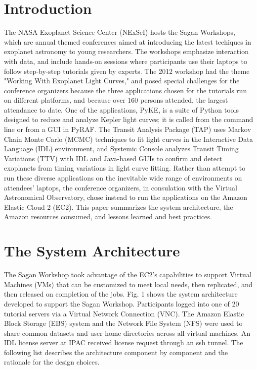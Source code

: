 \documentclass[11pt,twoside]{article}
\begin{document}
\begin{abstract}
We will describe the mechanisms for handling security, failovers, and licensing of commercial software. In particular, IDL licenses were managed through a server at Caltech, connected to the IDL instances running on Amazon EC2 via a Secure Shell (ssh) tunnel. The system operated flawlessly during the workshop.

\end {abstract}

\section{Introduction}
The NASA Exoplanet Science Center (NExScI) hosts the Sagan Workshops, which are annual themed conferences aimed at introducing the latest techiques in exoplanet astronomy to young researchers. The workshops emphasize interaction with data, and include hands-on sessions where participants use their laptops to follow step-by-step tutorials given by experts.  The 2012 workshop had the theme "Working With Exoplanet Light Curves," and posed special challenges for the conference organizers because the  three applications chosen for the tutorials run on different platforms, and because over 160 persons attended,  the largest attendance to date. One of the applications, PyKE, is a suite of Python tools designed to reduce and analyze Kepler light curves; it is called from the command line or from a GUI in PyRAF. The Transit Analysis Package (TAP) uses Markov Chain Monte Carlo (MCMC) techniques to fit light curves in the Interactive Data Language (IDL) environment, and Systemic Console analyzes Transit Timing Variations (TTV) with IDL and Java-based GUIs to confirm and detect exoplanets from timing variations in light curve fitting.  Rather than attempt to run these diverse applications on the inevitable wide range of environments on attendees' laptops, the conference organizers, in consulation with the Virtual Astronomical Observatory, chose instead to run the applications on the Amazon Elastic Cloud 2 (EC2). This paper summarizes the system architecture, the Amazon resources consumed, and lessons learned and best practices.

\section{The System Architecture}

The Sagan Workshop took advantage of the EC2's capabilities to support Virtual Machines (VMs) that can be customized to meet local needs, then replicated, and then released on completion of the jobs. Fig. 1 shows the system architecture developed to support the Sagan Workshop. Participants logged into one of 20 tutorial servers via a Virtual Network Connection (VNC). The Amazon Elastic Block Storage (EBS) system and the Network File System (NFS) were used to share common datasets and user home directories across all virtual machines. An IDL license server at IPAC received license request through an ssh tunnel. The following list describes the architecture component by component and the rationale for the design choices.
\end{document}
